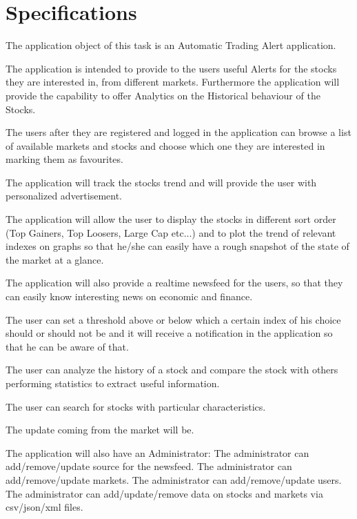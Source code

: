 \chapter{Specifications}

The application object of this task is an Automatic Trading Alert application.

The application is intended to provide to the users useful Alerts for the
stocks they are interested in, from different markets. Furthermore the
application will provide the capability to offer Analytics on the Historical
behaviour of the Stocks.

The users after they are registered and logged in the application can browse a
list of available markets and stocks and choose which one they are interested
in marking them as favourites.

The application will track the stocks trend and will provide the user with
personalized advertisement.

The application will allow the user to display the stocks in different sort
order (Top Gainers, Top Loosers, Large Cap etc...) and to plot the trend of
relevant indexes on graphs so that he/she can easily have a rough snapshot of
the state of the market at a glance.

The application will also provide a realtime newsfeed for the users, so that
they can easily know interesting news on economic and finance.

The user can set a threshold above or below which a certain index of his choice
should or should not be and it will receive a notification in the application
so that he can be aware of that.

The user can analyze the history of a stock and compare the stock with others
performing statistics to extract useful information.

The user can search for stocks with particular characteristics.

The update coming from the market will be.

The application will also have an Administrator: The administrator can
add/remove/update source for the newsfeed. The administrator can
add/remove/update markets. The administrator can add/remove/update users. The
administrator can add/update/remove data on stocks and markets via csv/json/xml
files.